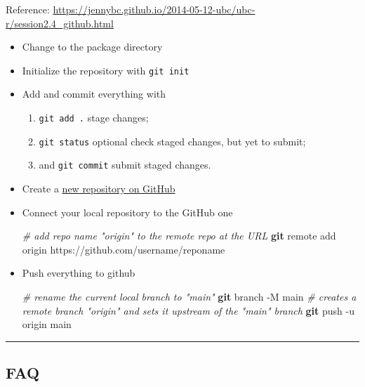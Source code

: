 \documentclass[
]{book}
\newenvironment{Shaded}{\begin{snugshade}}{\end{snugshade}}
\newcommand{\AttributeTok}[1]{\textcolor[rgb]{0.13,0.29,0.53}{#1}}
\newcommand{\CommentTok}[1]{\textcolor[rgb]{0.56,0.35,0.01}{\textit{#1}}}
\newcommand{\FunctionTok}[1]{\textcolor[rgb]{0.13,0.29,0.53}{\textbf{#1}}}
\newcommand{\NormalTok}[1]{#1}
\providecommand{\tightlist}{%
  \setlength{\itemsep}{0pt}\setlength{\parskip}{0pt}}
\theoremstyle{definition}
\theoremstyle{definition}
\theoremstyle{definition}
\theoremstyle{definition}
\theoremstyle{remark}
\begin{document}
Reference: \url{https://jennybc.github.io/2014-05-12-ubc/ubc-r/session2.4_github.html}

\begin{itemize}
\item
  Change to the package directory
\item
  Initialize the repository with \texttt{git\ init}
\item
  Add and commit everything with

  \begin{enumerate}
  \def\labelenumi{\arabic{enumi}.}
  \tightlist
  \item
    \texttt{git\ add\ .} stage changes;
  \item
    \texttt{git\ status} optional check staged changes, but yet to submit;
  \item
    and \texttt{git\ commit} submit staged changes.
  \end{enumerate}
\item
  Create a \href{https://github.com/new}{new repository on GitHub}
\item
  Connect your local repository to the GitHub one

\begin{Shaded}
\begin{Highlighting}[]
\CommentTok{\# add repo name "origin" to the remote repo at the URL}
\FunctionTok{git}\NormalTok{ remote add origin https://github.com/username/reponame}
\end{Highlighting}
\end{Shaded}
\item
  Push everything to github

\begin{Shaded}
\begin{Highlighting}[]
\CommentTok{\# rename the current local branch to "main"}
\FunctionTok{git}\NormalTok{ branch }\AttributeTok{{-}M}\NormalTok{ main}
\CommentTok{\# creates a remote branch "origin" and sets it upstream of the "main" branch}
\FunctionTok{git}\NormalTok{ push }\AttributeTok{{-}u}\NormalTok{ origin main}
\end{Highlighting}
\end{Shaded}
\end{itemize}

\begin{center}\rule{0.5\linewidth}{0.5pt}\end{center}

\subsection{FAQ}\label{faq}
\end{document}
